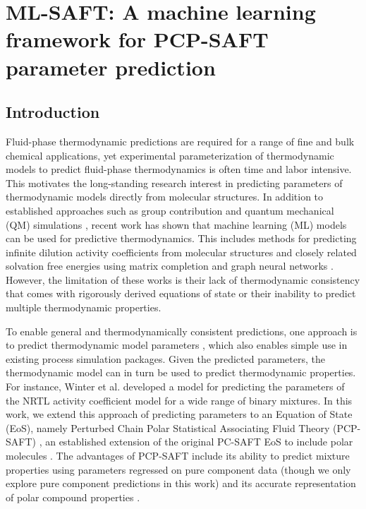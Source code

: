 \chapter{ML-SAFT: A machine learning framework for PCP-SAFT parameter prediction}\label{ch:deep_gamma} 

\section{Introduction}
\label{sec:intro}
Fluid-phase thermodynamic predictions are required for a range of fine and bulk chemical applications, yet experimental parameterization of thermodynamic models to predict fluid-phase thermodynamics is often time and labor intensive. This motivates the long-standing research interest in predicting parameters of thermodynamic models directly from molecular structures. In addition to established approaches such as group contribution\cite{Fredenslund1975} and quantum mechanical (QM) simulations \cite{Fingerhut2017,Kaminski2020}, recent work has shown that  machine learning (ML) models can be used for predictive thermodynamics. This includes methods for predicting infinite dilution activity coefficients from molecular structures and closely related  solvation free energies using matrix completion\cite{Jirasek2020} and graph neural networks \cite{Vermeire2021, Felton2022, SanchezMedina2022, Qin2023, Rittig2023}. However, the limitation of these works is their lack of thermodynamic consistency that comes with rigorously derived equations of state or their inability to predict multiple thermodynamic properties. 

To enable general and thermodynamically consistent predictions, one approach is to predict thermodynamic model parameters \cite{Abbasi2020, Matsukawa2021, Madani2021, Abdallahelhadj2022, Winter2022}, which also enables simple use in existing process simulation packages. Given the predicted parameters, the thermodynamic model can in turn be used to predict thermodynamic properties. For instance, Winter et al. \cite{Winter2022} developed a model for predicting the parameters of the NRTL activity coefficient model for a wide range of binary mixtures. In this work, we extend this approach of predicting parameters to an Equation of State (EoS), namely Perturbed Chain Polar Statistical Associating Fluid Theory (PCP-SAFT) \cite{Gross2006}, an established extension of the original PC-SAFT EoS to include polar molecules \cite{Gross2001}. The advantages of PCP-SAFT include its ability to predict mixture properties using parameters regressed on pure component data (though we only explore pure component predictions in this work) and its accurate representation of polar compound properties \cite{Cripwell2017}. 

